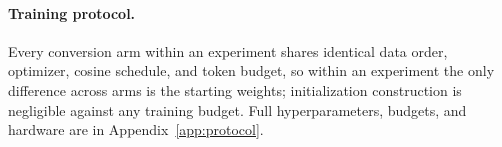 \paragraph{Training protocol.}
Every conversion arm within an experiment shares identical data order,
optimizer, cosine schedule, and token budget, so within an experiment the only
difference across arms is the starting weights; initialization construction is
negligible against any training budget. Full hyperparameters, budgets, and
hardware are in Appendix~\ref{app:protocol}.
